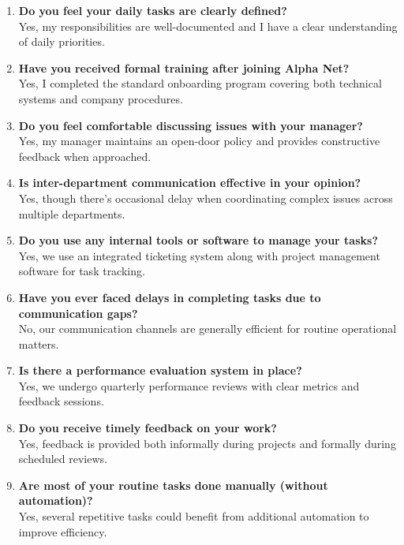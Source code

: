 \begin{enumerate}
    \item \textbf{Do you feel your daily tasks are clearly defined?}\\
    Yes, my responsibilities are well-documented and I have a clear understanding of daily priorities.
    
    \item \textbf{Have you received formal training after joining Alpha Net?}\\
    Yes, I completed the standard onboarding program covering both technical systems and company procedures.
    
    \item \textbf{Do you feel comfortable discussing issues with your manager?}\\
    Yes, my manager maintains an open-door policy and provides constructive feedback when approached.
    
    \item \textbf{Is inter-department communication effective in your opinion?}\\
    Yes, though there's occasional delay when coordinating complex issues across multiple departments.
    
    \item \textbf{Do you use any internal tools or software to manage your tasks?}\\
    Yes, we use an integrated ticketing system along with project management software for task tracking.
    
    \item \textbf{Have you ever faced delays in completing tasks due to communication gaps?}\\
    No, our communication channels are generally efficient for routine operational matters.
    
    \item \textbf{Is there a performance evaluation system in place?}\\
    Yes, we undergo quarterly performance reviews with clear metrics and feedback sessions.
    
    \item \textbf{Do you receive timely feedback on your work?}\\
    Yes, feedback is provided both informally during projects and formally during scheduled reviews.
    
    \item \textbf{Are most of your routine tasks done manually (without automation)?}\\
    Yes, several repetitive tasks could benefit from additional automation to improve efficiency.
    

\end{enumerate}
